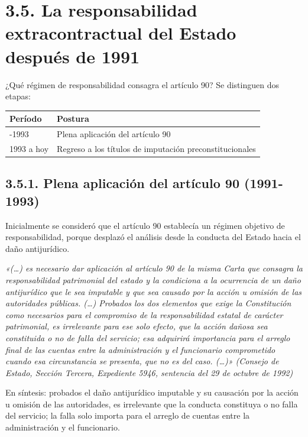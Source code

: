 \section{3.5. La responsabilidad extracontractual del Estado después de 1991}
¿Qué régimen de responsabilidad consagra el artículo 90? Se distinguen dos etapas:

\begin{tabla}
\begin{longtable}{|>{\raggedright\arraybackslash}m{}|>{\raggedright\arraybackslash}m{}|}
\hline
\cellcolor[HTML]{1F3864}\textcolor[HTML]{FFFFFF}{\textbf{Período}} & \cellcolor[HTML]{1F3864}\textcolor[HTML]{FFFFFF}{\textbf{Postura}} \\ \hline
1991-1993 & Plena aplicación del artículo 90 \\ \hline
\cellcolor[HTML]{F2F5FA}1993 a hoy & \cellcolor[HTML]{F2F5FA}Regreso a los títulos de imputación preconstitucionales \\ \hline
\end{longtable}
\end{tabla}
\subsection{3.5.1. Plena aplicación del artículo 90 (1991-1993)}
Inicialmente se consideró que el artículo 90 establecía un régimen objetivo de responsabilidad, porque desplazó el análisis desde la conducta del Estado hacia el daño antijurídico.

\begin{cita}
\textit{«(…) es necesario dar aplicación al artículo 90 de la misma Carta que consagra la responsabilidad patrimonial del estado y la condiciona a la ocurrencia de un daño antijurídico que le sea imputable y que sea causado por la acción u omisión de las autoridades públicas. (…) Probados los dos elementos que exige la Constitución como necesarios para el compromiso de la responsabilidad estatal de carácter patrimonial, es irrelevante para ese solo efecto, que la acción dañosa sea constituida o no de falla del servicio; esa adquirirá importancia para el arreglo final de las cuentas entre la administración y el funcionario comprometido cuando esa circunstancia se presenta, que no es del caso. (…)» (Consejo de Estado, Sección Tercera, Expediente 5946, sentencia del 29 de octubre de 1992)}
\end{cita}
En síntesis: probados el daño antijurídico imputable y su causación por la acción u omisión de las autoridades, es irrelevante que la conducta constituya o no falla del servicio; la falla solo importa para el arreglo de cuentas entre la administración y el funcionario.

